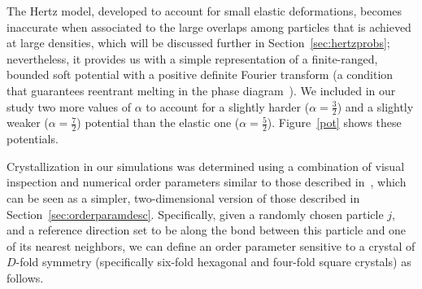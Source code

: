 The Hertz model,  developed to account for small elastic deformations,
becomes inaccurate when associated to the large overlaps among particles that is
achieved at large densities, which will be discussed further in Section~\ref{sec:hertzprobs}; nevertheless, it provides us with a simple representation of a 
finite-ranged, bounded soft potential with a positive definite Fourier transform 
(a condition that guarantees reentrant melting in the phase diagram~\cite{likos}). 
We included in our study two more values of $\alpha$ to account for a slightly harder 
($\alpha=\frac{3}{2}$) and a slightly weaker ($\alpha=\frac{7}{2}$) potential than the elastic one ($\alpha=\frac{5}{2}$).
Figure~\ref{pot} shows these potentials. 
  
Crystallization in our simulations was determined using a combination of visual inspection and numerical order parameters similar to those described in~\cite{binder}, which can be seen as a simpler, two-dimensional version of those described in Section~\ref{sec:orderparamdesc}. Specifically,  given a randomly chosen particle $j$, and a reference direction set to be along the bond between this particle and one of its nearest neighbors, we can define an order parameter sensitive to a crystal of $D$-fold symmetry (specifically six-fold hexagonal and four-fold square crystals) as follows.


